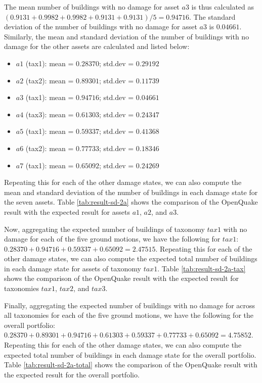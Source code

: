 The mean number of buildings with no damage for asset $a3$ is thus calculated as $(0.9131 + 0.9982 + 0.9982 + 0.9131 + 0.9131)/5 = 0.94716$. The standard deviation of the number of buildings with no damage for asset $a3$ is $0.04661$. Similarly, the mean and standard deviation of the number of buildings with no damage for the other assets are calculated and listed below:

\begin{itemize}
	\item $a1$ (tax1): mean = $0.28370$; std.dev = $0.29192$
	\item $a2$ (tax2): mean = $0.89301$; std.dev = $0.11739$
	\item $a3$ (tax1): mean = $0.94716$; std.dev = $0.04661$
	\item $a4$ (tax3): mean = $0.61303$; std.dev = $0.24347$
	\item $a5$ (tax1): mean = $0.59337$; std.dev = $0.41368$
	\item $a6$ (tax2): mean = $0.77733$; std.dev = $0.18346$
	\item $a7$ (tax1): mean = $0.65092$; std.dev = $0.24269$
\end{itemize}

Repeating this for each of the other damage states, we can also compute the mean and standard deviation of the number of buildings in each damage state for the seven assets. Table \ref{tab:result-sd-2a} shows the comparison of the OpenQuake result with the expected result for assets $a1$, $a2$, and $a3$.



Now, aggregating the expected number of buildings of taxonomy $tax1$ with no damage for each of the five ground motions, we have the following for $tax1$: $0.28370 + 0.94716 + 0.59337 + 0.65092 = 2.47515$. Repeating this for each of the other damage states, we can also compute the expected total number of buildings in each damage state for assets of taxonomy $tax1$. Table \ref{tab:result-sd-2a-tax} shows the comparison of the OpenQuake result with the expected result for taxonomies $tax1$, $tax2$, and $tax3$.



Finally, aggregating the expected number of buildings with no damage for across all taxonomies for each of the five ground motions, we have the following for the overall portfolio: $0.28370 + 0.89301 + 0.94716 + 0.61303 + 0.59337 + 0.77733 + 0.65092 = 4.75852$. Repeating this for each of the other damage states, we can also compute the expected total number of buildings in each damage state for the overall portfolio. Table \ref{tab:result-sd-2a-total} shows the comparison of the OpenQuake result with the expected result for the overall portfolio.


